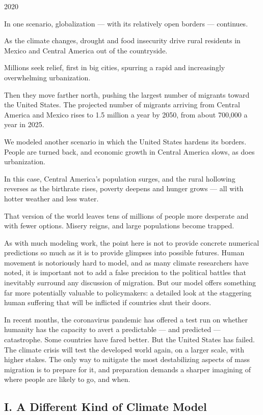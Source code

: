 2020

In one scenario, globalization --- with its relatively open borders ---
continues.

As the climate changes, drought and food insecurity drive rural
residents in Mexico and Central America out of the countryside.

Millions seek relief, first in big cities, spurring a rapid and
increasingly overwhelming urbanization.

Then they move farther north, pushing the largest number of migrants
toward the United States. The projected number of migrants arriving from
Central America and Mexico rises to 1.5 million a year by 2050, from
about 700,000 a year in 2025.

We modeled another scenario in which the United States hardens its
borders. People are turned back, and economic growth in Central America
slows, as does urbanization.

In this case, Central America's population surges, and the rural
hollowing reverses as the birthrate rises, poverty deepens and hunger
grows --- all with hotter weather and less water.

That version of the world leaves tens of millions of people more
desperate and with fewer options. Misery reigns, and large populations
become trapped.

As with much modeling work, the point here is not to provide concrete
numerical predictions so much as it is to provide glimpses into possible
futures. Human movement is notoriously hard to model, and as many
climate researchers have noted, it is important not to add a false
precision to the political battles that inevitably surround any
discussion of migration. But our model offers something far more
potentially valuable to policymakers: a detailed look at the staggering
human suffering that will be inflicted if countries shut their doors.

In recent months, the coronavirus pandemic has offered a test run on
whether humanity has the capacity to avert a predictable --- and
predicted --- catastrophe. Some countries have fared better. But the
United States has failed. The climate crisis will test the developed
world again, on a larger scale, with higher stakes. The only way to
mitigate the most destabilizing aspects of mass migration is to prepare
for it, and preparation demands a sharper imagining of where people are
likely to go, and when.

\hypertarget{i-a-different-kind-of-climate-model}{%
\subsection{I. A Different Kind of Climate
Model}\label{i-a-different-kind-of-climate-model}}

